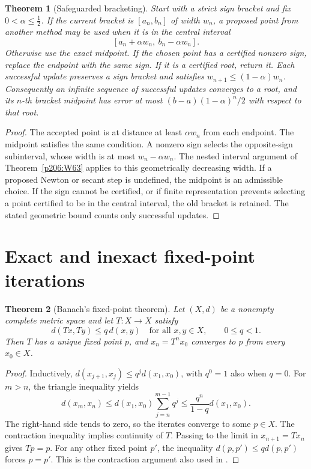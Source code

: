 \documentclass[11pt,oneside,openany]{book}
\theoremstyle{plain}
\newtheorem{theorem}{Theorem}[chapter]
\theoremstyle{definition}
\theoremstyle{remark}
\begin{document}
\begin{theorem}[Safeguarded bracketing]\label{p206:W65}
Start with a strict sign bracket and fix \(0<\alpha\le\tfrac12\).
If the current bracket is \([a_n,b_n]\) of width \(w_n\), a proposed
point from another method may be used when it is in the central
interval
\[
 [a_n+\alpha w_n,\ b_n-\alpha w_n].
\]
Otherwise use the exact midpoint. If the chosen point has a certified
nonzero sign, replace the endpoint with the same sign. If it is a
certified root, return it. Each successful update preserves a sign
bracket and satisfies \(w_{n+1}\le(1-\alpha)w_n\). Consequently an
infinite sequence of successful updates converges to a root, and
its \(n\)-th bracket midpoint has error at most
\((b-a)(1-\alpha)^n/2\) with respect to that root.
\end{theorem}
\begin{proof}
The accepted point is at distance at least \(\alpha w_n\) from
each endpoint. The midpoint satisfies the same condition.
A nonzero sign selects the opposite-sign subinterval, whose width
is at most \(w_n-\alpha w_n\). The nested interval argument of
Theorem~\ref{p206:W63} applies to this geometrically decreasing
width. If a proposed Newton or secant step is undefined, the midpoint
is an admissible choice. If the sign cannot be certified, or if
finite representation prevents selecting a point certified to be in
the central interval, the old bracket is retained. The stated
geometric bound counts only successful updates.
\end{proof}

\section{Exact and inexact fixed-point iterations}

\begin{theorem}[Banach's fixed-point theorem]\label{p206:W66}
Let \((X,d)\) be a nonempty complete metric space and let
\(T\colon X\to X\) satisfy
\[
 d(Tx,Ty)\le q\,d(x,y)\quad\text{for all }x,y\in X,\qquad
 0\le q<1.
\]
Then \(T\) has a unique fixed point \(p\), and \(x_n=T^n x_0\)
converges to \(p\) from every \(x_0\in X\).
\end{theorem}
\begin{proof}
Inductively, \(d(x_{j+1},x_j)\le q^j d(x_1,x_0)\), with \(q^0=1\)
also when \(q=0\). For \(m>n\), the triangle inequality yields
\[
 d(x_m,x_n)\le
 d(x_1,x_0)\sum_{j=n}^{m-1}q^j
 \le\frac{q^n}{1-q}d(x_1,x_0).
\]
The right-hand side tends to zero, so the iterates converge to
some \(p\in X\). The contraction inequality implies continuity of
\(T\). Passing to the limit in \(x_{n+1}=Tx_n\) gives \(Tp=p\).
For any other fixed point \(p'\), the inequality
\(d(p,p')\le qd(p,p')\) forces \(p=p'\).
This is the contraction argument also used in \cite{d10}.
\end{proof}
\end{document}
